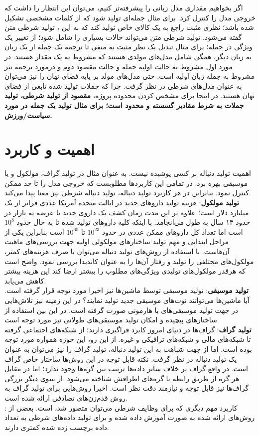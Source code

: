 اگر بخواهیم مقداری \task{} مدل زبانی را پیشرفته‌تر کنیم، می‌توان این انتظار را داشت که خروجی مدل را کنترل کرد. برای مثال جمله‌ای تولید شود که از کلمات مشخصی تشکیل شده باشد؛ نظری مثبت راجع به یک کالای خاص تولید کند که به این \task{}، تولید شرطی متن گفته می‌شود. تولید شرطی متن می‌تواند حالات بسیاری را شامل شود؛ از تغییر یک ویژگی در جمله؛ برای مثال تبدیل یک نظر مثبت به منفی تا ترجمه یک جمله از یک زبان به زبان دیگر، همگی شامل مدل‌های مولدی هستند که مشروط به یک مقدار هستند. در مورد اول مشروط به حالت اولیه جمله و حالت مقصود دوم و درمورد ترجمه نیز مشروط به جمله زبان اولیه است. حتی مدل‌های  مولد بر پایه فضای نهان را نیز می‌توان به عنوان مدل‌های شرطی در نظر گرفت. چرا که جملات تولید شده تابعی از فضای نهان هستند. در اینجا برای مشخص کردن محدوده پروژه، 
{\bf
    مقصود از تولید شرطی، تولید جملات به شرط مقادیر گسسته و محدود است؛ برای مثال تولید یک جمله در مورد سیاست/ورزش.}
\section{اهمیت و کاربرد}
اهمیت تولید دنباله بر کسی پوشیده نیست. به عنوان مثال در تولید گراف، مولکول و یا موسیقی بهره برد. در تمامی این کاربردها مطلوبست که خروجی مدل را تا حد ممکن کنترل نمود. بنابراین در هر کاربرد تولید دنباله، تولید دنباله شرطی نیز معنا پیدا می‌کند.
\\
{\bf تولید مولکول}:
هزینه تولید دارو‌های جدید در ایالت متحده آمریکا عددی فراتر از یک میلیارد دلار است؛ علاوه بر این مدت زمان کشف یک داروی جدید تا عرضه به بازار در حدود ۱۳ سال به طول می‌انجامد. با اینکه کلیه دارو‌های تولید شده تا به حال حدود $10^8$ است اما تعداد کل دارو‌های ممکن عددی در حدود $10^{23}$ تا $10^{60}$ است بنابراین یکی از مراحل ابتدایی و مهم تولید ساختارهای مولکولی اولیه جهت بررسی‌های ماهیت آن‌هاست. با استفاده از روش‌های تولید دنباله می‌توان با صرف هزینه‌های کمتر، مولکول‌های مختلفی را تولید و رفتار آن‌ها را به عنوان کاندیدا بررسی نمود. واضح است که هرقدر مولکول‌های تولیدی ویژگی‌های مطلوب را بیشتر ارضا کند این هزینه بیشتر کاهش می‌یابد.
\\
{\bf تولید موسیقی}:
تولید موسیقی توسط ماشین‌ها نیز اخیرا مورد توجه قرار گرفته است. آیا ماشین‌ها می‌توانند نوت‌های موسیقی جدید تولید نمایند؟ در این زمینه نیز تلاش‌هایی در جهت تولید موسیقی‌های با هارمونی صورت گرفته است. در این بین استفاده از ساختارهای پیچیده و امکان تولید موسیقی‌های طولانی نیز مورد توجه است.
\\
{\bf تولید گراف}:
\task{}
گراف‌ها در دنیای امروز کابرد فراگیری دارند؛ از شبکه‌های اجتماعی گرفته تا شبکه‌های مالی و شبکه‌های ترافیکی و غیره. از این رو،‌ این حوزه همواره مورد توجه بوده است. اما از جهت شباهت به این تولید دنباله، تولید گراف را نیز می‌توان به عنوان یک \task{} تولید دنباله در نظر گرفت. نکته قابل توجه در این روش‌ها ساختار خاص گراف است. در واقع گراف بر خلاف سایر داده‌ها ترتیب بین گره‌ها وجود ندارد؛‌ اما در مقابل هر گره از طریق رابطه با گره‌های اطرافش شناخته می‌شود. از سوی دیگر بزرگی گراف‌ها نیز قابل توجه و نیازمند دقت نظر است. اخیرا روش‌هایی برای تولید گراف به روش قدم‌زن‌های تصادفی ارائه شده است.
\\
{\bf {}}:
کاربرد مهم دیگری که برای وظایف شرطی می‌توان متصور شد، \augmentation{} است. بعضی از روش‌های ارائه شده به صورت 
آموزش داده شده و برای تولید داده‌های شرطی به تعداد داده برچسب زده شده کمتری دارند.

